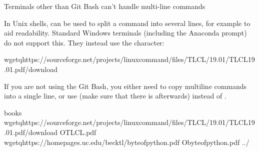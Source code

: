 \ignorespaces \begin{windowswit}[label={ww-no-multiline-commands}, before title={\thetcbcounter\ }, float, floatplacement=tbp, check odd page=true]{Terminals other than Git Bash can’t handle multi-line commands}
\label{\detokenize{basics/101-102-populate:ww-no-multiline-commands}}

\sphinxAtStartPar
In Unix shells, \sphinxcode{\sphinxupquote{\textbackslash{}}} can be used to split a command into several lines, for example to aid readability.
Standard Windows terminals (including the Anaconda prompt) do not support this.
They instead use the \sphinxcode{\sphinxupquote{\textasciicircum{}}} character:

\begin{sphinxVerbatim}[commandchars=\\\{\}]
wget\PYGZhy{}qhttps://sourceforge.net/projects/linuxcommand/files/TLCL/19.01/TLCL\PYGZhy{}19.01.pdf/download\PYGZca{}
\end{sphinxVerbatim}

\sphinxAtStartPar
If you are not using the Git Bash, you either need to copy multi\sphinxhyphen{}line commands into a single line, or use \sphinxcode{\sphinxupquote{\textasciicircum{}}} (make sure that there is  afterwards) instead of \sphinxcode{\sphinxupquote{\textbackslash{}}}.


\end{windowswit}

\ignorespaces 
\def\sphinxLiteralBlockLabel{\label{\detokenize{basics/101-102-populate:index-2}}}
\begin{sphinxVerbatim}[commandchars=\\\{\}]
books
wget\PYGZhy{}qhttps://sourceforge.net/projects/linuxcommand/files/TLCL/19.01/TLCL\PYGZhy{}19.01.pdf/download
\PYGZhy{}OTLCL.pdf
wget\PYGZhy{}qhttps://homepages.uc.edu/\PYGZti{}becktl/byte\PYGZus{}of\PYGZus{}python.pdf
\PYGZhy{}Obyte\PYGZhy{}of\PYGZhy{}python.pdf
../
\end{sphinxVerbatim}

